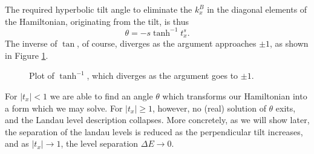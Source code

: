 The required hyperbolic tilt angle to eliminate the \(k^B_{x}\) in the diagonal elements of the Hamiltonian, originating from the tilt, is thus
\begin{equation}
  \label{eq:25}
  \theta = - s \tanh^{-1} t^s_{x}.
\end{equation}
The inverse of \(\tan \), of course, diverges as the argument approaches \(\pm 1\), as shown in Figure \ref{fig:arctanh}.
\begin{figure}[ht]
  \centering
  \caption{\label{fig:arctanh} Plot of \(\tanh^{-1}\), which diverges as the argument goes to \(\pm 1\).}
\end{figure}
For \(|t_{x}| < 1\) we are able to find an angle \(\theta \) which transforms our Hamiltonian into a form which we may solve.
For \(|t_{x}| \geq 1\), however, no (real) solution of \(\theta \) exits, and the Landau level description collapses.
More concretely, as we will show later, the separation of the landau levels is reduced as the perpendicular tilt increases, and as \( |t_x| \to 1 \), the level separation \( \Delta E \to 0 \).



